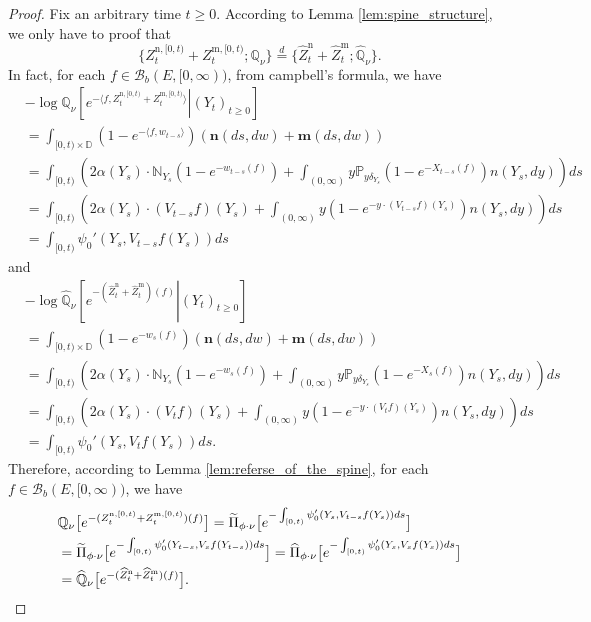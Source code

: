 \documentclass[12pt,a4paper]{amsart}
\numberwithin{equation}{section}
\theoremstyle{plain}
\theoremstyle{definition}
\begin{document}
\begin{proof}
	Fix an arbitrary time $t\geq 0$. According to Lemma \ref{lem:spine_structure}, we only have to proof that
  \[
    \{Z^{\mathrm n,[0,t)}_{t} + Z^{\mathrm m,[0,t)}_{t}; \mathbb Q_\nu\}
    \overset{d}{=}
    \{\widehat Z^{\mathrm n}_{t} + \widehat Z^{\mathrm m}_{t}; \widehat{\mathbb Q}_\nu\}.
  \]
	In fact, for each $f\in \mathcal B_b(E,[0,\infty))$, from campbell's formula, we have
  \begin{align}
    &-\log \mathbb Q_\nu \left [\left. e^{-\langle f, Z^{\mathrm n,[0,t)}_{t} + Z^{\mathrm m,[0,t)}_{t}\rangle}\right |(Y_t)_{t\geq 0}\right]
    \\&= \int_{[0,t)\times \mathbb D} \left(1-e^{- \langle f, w_{t-s}\rangle}\right)\left(\mathbf n(ds,dw) + \mathbf m(ds,dw)\right)
    \\&= \int_{[0,t)} \left(2\alpha(Y_s) \cdot \mathbb N_{Y_s}\left(1-e^{-w_{t-s}(f)}\right) + \int_{(0,\infty)} y \mathbb P_{y\delta_{Y_s}}\left(1-e^{-X_{t-s}(f)}\right)n(Y_s,dy)\right) ds
    \\&= \int_{[0,t)} \left(2\alpha(Y_s) \cdot (V_{t-s}f)(Y_s) + \int_{(0,\infty)} y \left(1-e^{-y\cdot(V_{t-s}f)(Y_s)}\right)n(Y_s,dy)\right) ds
    \\&= \int_{[0,t)} \psi_0'\left( Y_s, V_{t-s}f(Y_s)\right)ds
  \end{align}
	and
  \begin{align}
    &-\log \widehat{\mathbb Q}_\nu \left [\left. e^{-(\widehat Z^{\mathrm n}_{t} + \widehat Z^{\mathrm m}_{t})(f)}\right |(Y_t)_{t\geq 0}\right]
    \\&= \int_{[0,t)\times \mathbb D} \left(1-e^{- w_s(f)}\right)\left(\mathbf n(ds,dw) + \mathbf m(ds,dw)\right)
    \\&= \int_{[0,t)} \left(2\alpha(Y_s) \cdot \mathbb N_{Y_s}\left(1-e^{-w_{s}(f)}\right) + \int_{(0,\infty)} y \mathbb P_{y\delta_{Y_s}}\left(1-e^{-X_{s}(f)}\right)n(Y_s,dy)\right) ds
    \\&= \int_{[0,t)} \left(2\alpha(Y_s) \cdot (V_{t}f)(Y_s) + \int_{(0,\infty)} y \left(1-e^{-y\cdot(V_{t}f)(Y_s)}\right)n(Y_s,dy)\right) ds
    \\&= \int_{[0,t)} \psi_0'\left( Y_s, V_{t}f(Y_s)\right)ds.
  \end{align}
	Therefore, according to Lemma \ref{lem:referse_of_the_spine}, for each $f\in \mathcal B_b(E,[0,\infty))$, we have
  \begin{align}
  	&\mathbb Q_\nu  \big[e^{-(Z^{\mathrm n,[0,t)}_{t} + Z^{\mathrm m,[0,t)}_{t})(f)}\big]
     = \widetilde \Pi_{\phi\cdot\nu} \big[e^{-\int_{[0,t)} \psi_0'( Y_s, V_{t-s}f(Y_s))ds}\big]
  	\\&= \widetilde \Pi_{\phi\cdot\nu} \big[e^{-\int_{[0,t)} \psi_0'( Y_{t-s}, V_{s}f(Y_{t-s}))ds}\big]
  	= \widehat \Pi_{\phi\cdot\nu} \big[e^{-\int_{[0,t)} \psi_0'( Y_{s}, V_{s}f(Y_{s}))ds}\big]
  	\\&= \widehat{\mathbb Q}_\nu \big [e^{-(\widehat Z^{\mathrm n}_{t} + \widehat Z^{\mathrm m}_{t})(f)}\big].
  	\qedhere
  \end{align}
\end{proof}
\end{document}
